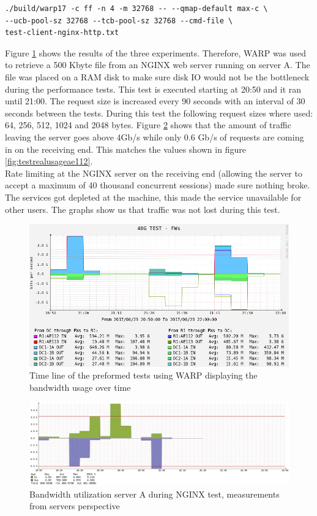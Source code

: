 \begin{verbatim}
./build/warp17 -c ff -n 4 -m 32768 -- --qmap-default max-c \
--ucb-pool-sz 32768 --tcb-pool-sz 32768 --cmd-file \
test-client-nginx-http.txt 
\end{verbatim} 

Figure \ref{fig:warptime} shows the results of the three experiments. 
Therefore, WARP was used to retrieve a 500 Kbyte file from an NGINX web server running on server A.
The file was placed on a RAM disk to make sure disk IO would not be the bottleneck during the performance tests. 
This test is executed starting at 20:50 and it ran until 21:00. The request size is increased every 90 seconds with an interval of 30 seconds between the tests.
During this test the following request sizes where used: 64, 256, 512, 1024 and 2048 bytes. 
Figure \ref{fig:realnginx} shows that the amount of traffic leaving the server goes above 4Gb/s while only 0.6 Gb/s of requests are coming in on the receiving end. 
This matches the values shown in figure \ref{fig:testrealusageae112}. \\
Rate limiting at the NGINX server on the receiving end (allowing the server to accept a maximum of 40 thousand concurrent sessions) made sure nothing broke. The services got depleted at the machine, this made the service unavailable for other users.
The graphs show us that traffic was not lost during this test.

\begin{figure}[]
  \includegraphics[scale=0.5]{images/warp-timeline.png}
  \caption{Time line of the preformed tests using WARP displaying the bandwidth usage over time}
  \label{fig:warptime}
\end{figure}

\begin{figure}
  \includegraphics[scale=0.35]{images/real-nginx.png}
  \caption{Bandwidth utilization server A during NGINX test, measurements from servers perspective }
  \label{fig:realnginx}
\end{figure}


